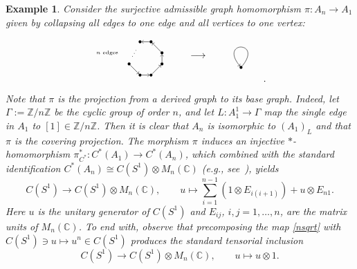 \documentclass[12pt,times,a4paper]{amsart}
\newtheorem{example}[theorem]{Example}
\numberwithin{equation}{section}
\numberwithin{equation}{section}
\begin{document}
\begin{example}\label{shrinking}
{\rm Consider the surjective admissible graph homomorphism $\pi:A_n\to A_1$ given by collapsing all edges to one edge and all vertices to one vertex:
\begin{equation}
\begin{tikzpicture}[scale=0.4,auto,swap]
\centering
\tikzstyle{vertex}=[circle,fill=black,minimum size=3pt,inner sep=0pt]
\tikzstyle{edge}=[draw,->]
\node (0) at (5,0) {};
    \node[vertex] (1) at (0,0) {};
    \node[vertex] (2) at (1,-1) {};
    \node[vertex] (3) at (2,-1) {};
    \node[vertex] (4) at (3,0) {};
    \node[vertex] (5) at (3,1) {};
    \node[vertex] (6) at (2,2) {};
    \node[vertex] (7) at (1,2) {};
    \node[rotate=60] (8) at (0.5,1) {{\tiny $\cdots$}};
    \node (9) at (-2,1) {{\tiny $n$ edges}};
    \path (1) edge[edge] node {} (2);
    \path (2) edge[edge] node {} (3);
    \path (3) edge[edge] node {} (4);
    \path (4) edge[edge] node {} (5);
    \path (5) edge[edge] node {} (6);
    \path (6) edge[edge] node {} (7);
\end{tikzpicture}
\begin{tikzpicture}[scale=0.4,auto,swap]
\centering
\node (1) at (0,0) {};
\node (2) at (0,-1) {$\longrightarrow$};
\node (3) at (0,-2) {};
\node (4) at (0,-3) {};
\end{tikzpicture}
\quad
\begin{tikzpicture}[scale=0.4,auto,swap]
\centering
\tikzstyle{vertex}=[circle,fill=black,minimum size=3pt,inner sep=0pt]
\tikzstyle{edge}=[draw,->]
\node (0) at (0,0) {};
    \node[vertex] (1) at (0,-1) {};
    \node (3) at (0,-2) {};
    \path (1) edge [edge, anchor=center, loop above, min distance=20mm, in=130, out=50, looseness=40] node {} (1);
\end{tikzpicture}.
\end{equation}
Note that $\pi$ is the projection from a derived graph to its base graph. Indeed, let $\Gamma:=\mathbb{Z}/n\mathbb{Z}$ be the cyclic group of order $n$, 
and let $L:A^1_1\to\Gamma$ map the single edge in $A_1$ to $[1]\in \mathbb{Z}/n\mathbb{Z}$. 
Then it is clear that $A_n$ is isomorphic to $(A_1)_L$ and that $\pi$ is the covering projection.
The morphism $\pi$ induces an injective $*$-homomorphism $\pi^*_{C^*}:C^*(A_1)\to C^*(A_n)$,
 which combined with the standard identification $C^*(A_n)\cong C(S^1)\otimes M_n(\mathbb{C})$ (e.g., see~\cite[Example~2.14]{i-r05}), yields
\begin{equation}\label{nsqrt}
C(S^1)\longrightarrow C(S^1)\otimes M_n(\mathbb{C}),\qquad u\longmapsto \sum_{i=1}^{n-1}(1\otimes E_{i(i+1)})+u\otimes E_{n1}.
\end{equation}
Here $u$ is the unitary generator of $C(S^1)$ and $E_{ij}$, $i,j=1,\ldots, n$, are the matrix units of $M_n(\mathbb{C})$. 
To end with, observe that precomposing the map \eqref{nsqrt} with $C(S^1)\ni u\mapsto u^n\in C(S^1)$ produces the standard tensorial inclusion
\begin{equation}
C(S^1)\longrightarrow C(S^1)\otimes M_n(\mathbb{C}),\qquad u\longmapsto u\otimes 1.
\end{equation}}
\end{example}
\end{document}
